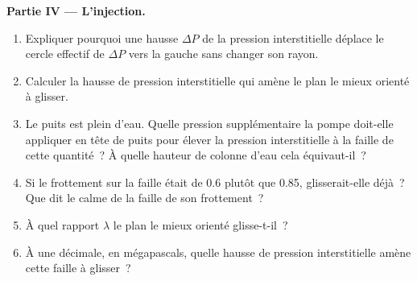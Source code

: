 \begin{problem}
\medskip
\noindent\textbf{Partie IV --- L'injection.}
\begin{enumerate}[resume]
  \item Expliquer pourquoi une hausse $\Delta P$ de la pression interstitielle déplace le cercle
        effectif de $\Delta P$ vers la gauche sans changer son rayon.
  \item Calculer la hausse de pression interstitielle qui amène le plan le mieux orienté
        à glisser.
  \item Le puits est plein d'eau. Quelle pression supplémentaire la pompe doit-elle appliquer
        en tête de puits pour élever la pression interstitielle à la faille de cette quantité~?
        À quelle hauteur de colonne d'eau cela équivaut-il~?
  \item Si le frottement sur la faille était de 0.6 plutôt que 0.85, glisserait-elle
        déjà~? Que dit le calme de la faille de son
        frottement~?
  \item À quel rapport $\lambda$ le plan le mieux orienté glisse-t-il~?
  \item À une décimale, en mégapascals, quelle hausse de pression interstitielle amène cette
        faille à glisser~?
\end{enumerate}
\end{problem}
